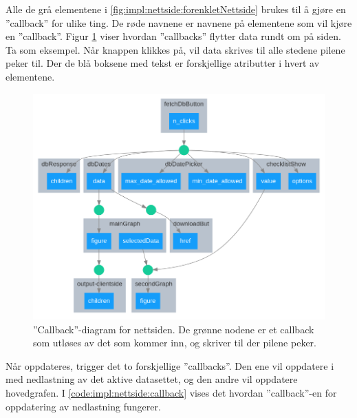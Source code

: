 Alle de grå elementene i \autoref{fig:impl:nettside:forenkletNettside} brukes til å gjøre en ''callback'' for ulike ting. 
De røde navnene er navnene på elementene som vil kjøre en ''callback''.
Figur \ref{fig:impl:nettside:callback} viser hvordan ''callbacks'' flytter data rundt om på siden. 
Ta  som eksempel. 
Når knappen klikkes på, vil data skrives til alle stedene pilene peker til. 
Der de blå boksene med tekst er forskjellige atributter i hvert av elementene.


\begin{figure}[!htbp]
    \centering
    \includegraphics[width=.9\textwidth]{implementering/nettside/callbacks.png}
    \caption{''Callback''-diagram for nettsiden. De grønne nodene er et callback som utløses av det som kommer inn, og skriver til der pilene peker.}
    \label{fig:impl:nettside:callback}
\end{figure}

Når  oppdateres, trigger det to forskjellige ''callbacks''. 
Den ene vil oppdatere  i  med nedlastning av det aktive datasettet, og den andre vil oppdatere hovedgrafen.
I \autoref{code:impl:nettside:callback} vises det hvordan ''callback''-en for oppdatering av nedlastning fungerer. 

